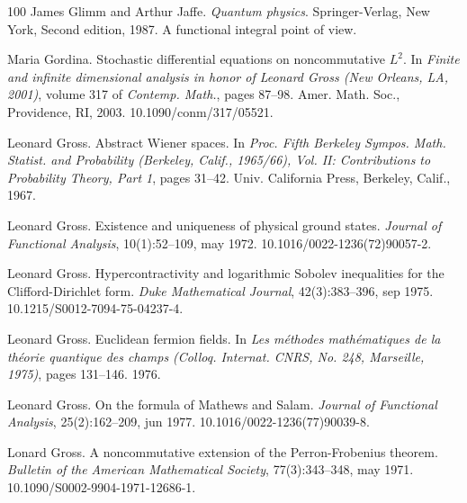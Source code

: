 \documentclass{article}
\newcommand{\tmtextit}[1]{{\itshape{#1}}}
\begin{document}
\begin{thebibliography}{100}
  James Glimm  and  Arthur Jaffe.
  {\newblock}\tmtextit{Quantum physics}. {\newblock}Springer-Verlag, New York,
  Second  edition, 1987. {\newblock}A functional integral point of
  view.{\newblock}
  
  Maria Gordina. {\newblock}Stochastic differential
  equations on noncommutative $L^2$. {\newblock}In \tmtextit{Finite and
  infinite dimensional analysis in honor of Leonard Gross (New Orleans, LA,
  2001)},  volume  317  of \tmtextit{Contemp. Math.},  pages  87--98. Amer.
  Math. Soc., Providence, RI, 2003.
  {\newblock}\href{Https://doi.org/10.1090/conm/317/05521}{}10.1090/conm/317/05521.{\newblock}
  
  Leonard Gross. {\newblock}Abstract Wiener spaces.
  {\newblock}In \tmtextit{Proc. Fifth Berkeley Sympos. Math. Statist. and
  Probability (Berkeley, Calif., 1965/66), Vol. II: Contributions to
  Probability Theory, Part 1},  pages  31--42. Univ. California Press,
  Berkeley, Calif., 1967.{\newblock}
  
  Leonard Gross. {\newblock}Existence and
  uniqueness of physical ground states. {\newblock}\tmtextit{Journal of
  Functional Analysis}, 10(1):52--109, may 1972.
  {\newblock}\href{Https://doi.org/10.1016/0022-1236(72)90057-2}{}10.1016/0022-1236(72)90057-2.{\newblock}
  
  Leonard Gross.
  {\newblock}Hypercontractivity and logarithmic Sobolev inequalities for the
  Clifford-Dirichlet form. {\newblock}\tmtextit{Duke Mathematical Journal},
  42(3):383--396, sep 1975.
  {\newblock}\href{Https://doi.org/10.1215/S0012-7094-75-04237-4}{}10.1215/S0012-7094-75-04237-4.{\newblock}
  
  Leonard Gross. {\newblock}Euclidean
  fermion fields. {\newblock}In \tmtextit{Les m{\'e}thodes math{\'e}matiques
  de la th{\'e}orie quantique des champs (Colloq. Internat. CNRS, No. 248,
  Marseille, 1975)},  pages  131--146. 1976.{\newblock}
  
  Leonard Gross. {\newblock}On the formula of
  Mathews and Salam. {\newblock}\tmtextit{Journal of Functional Analysis},
  25(2):162--209, jun 1977.
  {\newblock}\href{Https://doi.org/10.1016/0022-1236(77)90039-8}{}10.1016/0022-1236(77)90039-8.{\newblock}
  
  Lonard Gross. {\newblock}A
  noncommutative extension of the Perron-Frobenius theorem.
  {\newblock}\tmtextit{Bulletin of the American Mathematical Society},
  77(3):343--348, may 1971.
  {\newblock}\href{Https://doi.org/10.1090/S0002-9904-1971-12686-1}{}10.1090/S0002-9904-1971-12686-1.{\newblock}
  

\end{thebibliography}
\end{document}
